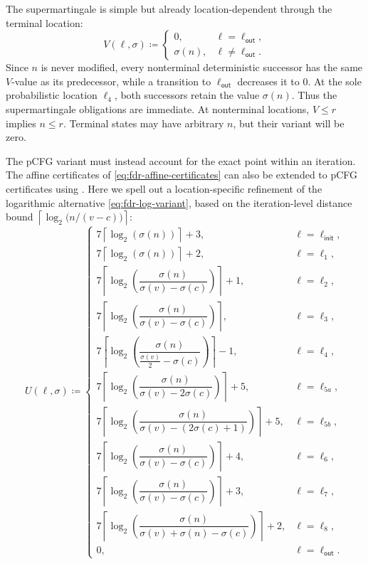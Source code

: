 The supermartingale is simple but already location-dependent through the
terminal location:
\[
    V(\ell,\sigma)
    \coloneqq
    \begin{cases}
        0, & \ell=\ell_{\mathsf{out}},\\
        \sigma(n), & \ell\neq\ell_{\mathsf{out}}.
    \end{cases}
\]
Since $n$ is never modified, every nonterminal deterministic successor has
the same $V$-value as its predecessor, while a transition to
$\ell_{\mathsf{out}}$ decreases it to $0$.  At the sole probabilistic location
$\ell_4$, both successors retain the value $\sigma(n)$.  Thus the
supermartingale obligations are immediate.  At nonterminal locations, $V\leq r$ implies $n\leq r$. Terminal
states may have arbitrary $n$, but their variant will be zero.

The pCFG variant must instead account for the exact point within an iteration.
The affine certificates of \eqref{eq:fdr-affine-certificates} can also
be extended to pCFG certificates using .
Here we spell out a location-specific refinement of the logarithmic
alternative \eqref{eq:fdr-log-variant}, based on the iteration-level
distance bound $\left\lceil\log_2\!\bigl(n/(v-c)\bigr)\right\rceil$:
\[
U(\ell,\sigma)\coloneqq
\begin{cases}
  7\left\lceil\log_2(\sigma(n))\right\rceil+3,
    & \ell=\ell_{\mathsf{init}},\\[2pt]
  7\left\lceil\log_2(\sigma(n))\right\rceil+2,
    & \ell=\ell_1,\\[2pt]
  7\left\lceil
      \log_2\!\left(\dfrac{\sigma(n)}{\sigma(v)-\sigma(c)}\right)
    \right\rceil+1,
    & \ell=\ell_2,\\[8pt]
  7\left\lceil
      \log_2\!\left(\dfrac{\sigma(n)}{\sigma(v)-\sigma(c)}\right)
    \right\rceil,
    & \ell=\ell_3,\\[8pt]
  7\left\lceil
      \log_2\!\left(
        \dfrac{\sigma(n)}{\frac{\sigma(v)}2-\sigma(c)}
      \right)
    \right\rceil-1,
    & \ell=\ell_4,\\[10pt]
  7\left\lceil
      \log_2\!\left(
        \dfrac{\sigma(n)}{\sigma(v)-2\sigma(c)}
      \right)
    \right\rceil+5,
    & \ell=\ell_{5a},\\[10pt]
  7\left\lceil
      \log_2\!\left(
        \dfrac{\sigma(n)}{\sigma(v)-(2\sigma(c)+1)}
      \right)
    \right\rceil+5,
    & \ell=\ell_{5b},\\[10pt]
  7\left\lceil
      \log_2\!\left(\dfrac{\sigma(n)}{\sigma(v)-\sigma(c)}\right)
    \right\rceil+4,
    & \ell=\ell_6,\\[10pt]
  7\left\lceil
      \log_2\!\left(\dfrac{\sigma(n)}{\sigma(v)-\sigma(c)}\right)
    \right\rceil+3,
    & \ell=\ell_7,\\[10pt]
  7\left\lceil
      \log_2\!\left(
        \dfrac{\sigma(n)}{\sigma(v)+\sigma(n)-\sigma(c)}
      \right)
    \right\rceil+2,
    & \ell=\ell_8,\\[10pt]
  0,
    & \ell=\ell_{\mathsf{out}}.
\end{cases}
\]

